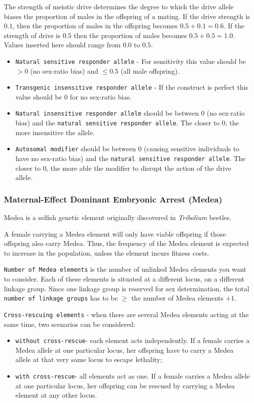 \documentclass[11pt]{article}
\newcommand{\linecmd}[1]{\texttt{#1}}
\begin{document}
The strength of meiotic drive determines the degree to which the drive allele biases the proportion of males in the offspring of a mating. If the drive strength is $0.1$, then the proportion of males in the offspring becomes $0.5 + 0.1 = 0.6$. If the strength of drive is $0.5$ then the proportion of males becomes $0.5 + 0.5 = 1.0$. Values inserted here should range from $0.0$ to $0.5$.
\begin{itemize}
	\item \linecmd{Natural sensitive responder allele} - For sensitivity this value should be $>0$ (no sex-ratio bias) and $\leq0.5$ (all male offspring).
	\item \linecmd{Transgenic insensitive responder allele} - If the construct is perfect this value should be 0 for no sex-ratio bias.
	\item \linecmd{Natural insensitive responder allele} should be between 0 (no sex-ratio bias) and the \linecmd{natural sensitive responder allele}. The closer to 0, the more insensitive the allele.
	\item \linecmd{Autosomal modifier} should be between 0 (causing sensitive individuals to have no sex-ratio bias) and the \linecmd{natural sensitive responder allele}. The closer to 0, the more able the modifier to disrupt the action of the drive allele.
\end{itemize}

\subsubsection{Maternal-Effect Dominant Embryonic Arrest (Medea)}
Medea is a selfish genetic element originally discovered in \emph{Tribolium} beetles. %
 
A female carrying a Medea element will only have viable offspring if those offspring also carry Medea. Thus, the frequency of the Medea element is expected to increase in the population, unless the element incurs fitness costs.

\linecmd{Number of Medea elements} is the number of unlinked Medea elements you want to consider. Each of these elements is situated at a different locus, on a different linkage group. Since one linkage group is reserved for sex determination, the total \linecmd{number of linkage groups} has to be $\geq$ the number of Medea elements $+1$.

\linecmd{Cross-rescuing elements} - when there are several Medea elements acting at the same time, two scenarios can be considered:
\begin{itemize}
	\item \linecmd{without cross-rescue}- each element acts independently. If a female carries a Medea allele at one particular locus, her offspring have to carry a Medea allele at that very same locus to escape lethality;
	\item \linecmd{with cross-rescue}- all elements act as one. If a female carries a Medea allele at one particular locus, her offspring can be rescued by carrying a Medea element at any other locus.
\end{itemize}
\end{document}
